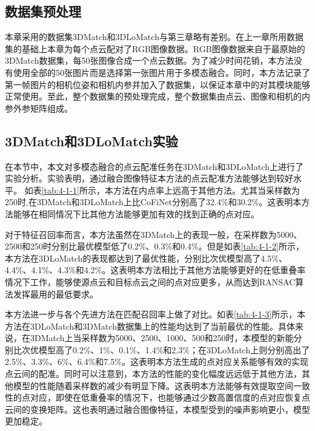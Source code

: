     \subsection{数据集预处理}
    本章采用的数据集3DMatch和3DLoMatch与第三章略有差别。在上一章所用数据集的基础上本章为每个点云配对了RGB图像数据。RGB图像数据来自于最原始的3DMatch数据集，每50张图像合成一个点云数据。为了减少时间花销，本方法没有使用全部的50张图片而是选择第一张图片用于多模态融合。同时，本方法记录了第一帧图片的相机位姿和相机内参并加入了数据集，以保证本章中的对其模块能够正常使用。至此，整个数据集的预处理完成，整个数据集由点云、图像和相机的内参外参矩阵组成。
    \subsection{3DMatch和3DLoMatch实验}
    在本节中，本文对多模态融合的点云配准任务在3DMatch和3DLoMatch上进行了实验分析。实验表明，通过融合图像特征本方法的点云配准方法能够达到较好水平。
    如表\ref{tab:4-1-1}所示，本方法在内点率上远高于其他方法。尤其当采样数为250时,在3DMatch和3DLoMatch上比CoFiNet分别高了32.4\%和30.2\%。这表明本方法能够在相同情况下比其他方法能够更加有效的找到正确的点对应。\par
    

    对于特征召回率而言，本方法虽然在3DMatch上的表现一般，在采样数为5000、2500和250时分别比最优模型低了0.2\%、0.3\%和0.4\%。但是如表\ref{tab:4-1-2}所示，本方法在3DLoMatch的表现都达到了最优性能，分别比次优模型高了4.5\%、4.4\%、4.1\%、4.3\%和4.2\%。这表明本方法相比于其他方法能够更好的在低重叠率情况下工作，能够使源点云和目标点云之间的点对应更多，从而达到RANSAC算法发挥最用的最低要求。\par
    

    本方法进一步与各个先进方法在匹配召回率上做了对比。如表\ref{tab:4-1-3}所示，本方法在3DLoMatch和3DMatch数据集上的性能均达到了当前最优的性能。具体来说，在3DMatch上当采样数为5000、2500、1000、500和250时，本模型的新能分别比次优模型高了0.2\%、1\%、0.1\%、1.4\%和2.3\%；在3DLoMatch上则分别高出了2.5\%、3.3\%、6\%、6.4\%和7.5\%。这表明本方法生成的点对应关系能够有效的实现点云间的配准。同时可以注意到，本方法的性能的变化幅度远远低于其他方法，其他模型的性能随着采样数的减少有明显下降。这表明本方法能够有效提取空间一致性的点对应，即使在低重叠率的情况下，也能够通过少数高置信度的点对应恢复点云间的变换矩阵。这也表明通过融合图像特征，本模型受到的噪声影响更小，模型更加稳定。\par
    

